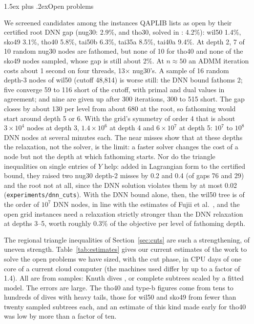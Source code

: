 \documentclass[10pt]{article}
\makeatletter
\renewcommand\subsection{\@startsection{subsection}{2}{\z@}{-3.25ex plus -1ex minus -.2ex}%
  {1.5ex plus .2ex}{\normalfont\normalsize\bfseries}}
\theoremstyle{remark}
\makeatother
\begin{document}
\subsection{Open problems}\label{sec:open}

We screened candidates among the instances QAPLIB lists as open by their certified
root DNN gap (nug30: 2.9\%, and tho30, solved in \cite{abgl}: 4.2\%): wil50 1.4\%,
sko49 3.1\%, tho40 5.8\%, tai50b 6.3\%, tai35a 8.5\%, tai40a 9.4\%. At depth 2, 7 of 10
random nug30 nodes are fathomed, but none of 10 for tho40 and none of the sko49 nodes
sampled, whose gap is still about 2\%. At $n\approx50$ an ADMM iteration costs about
1 second on four threads, 13$\times$ nug30's. A sample of 16 random depth-3 nodes of
wil50 (cutoff 48,814) is worse still: the DNN bound fathoms 2; five converge 59 to 116
short of the cutoff, with primal and dual values in agreement; and nine are given up
after 300 iterations, 300 to 515 short. The gap closes by about 130 per level from about
680 at the root, so fathoming would start around depth 5 or 6. With the grid's
symmetry of order 4 that is about $3\times10^4$ nodes at depth 3, $1.4\times10^6$ at
depth 4 and $6\times10^7$ at depth 5: $10^7$ to $10^8$ DNN nodes at several minutes
each. The near misses show that at these depths the relaxation, not the solver, is
the limit: a faster solver changes the cost of a node but not the depth at which
fathoming starts. Nor do the triangle inequalities on single entries of $Y$ help: added in Lagrangian
form to the certified bound, they raised two nug30 depth-2 misses by 0.2 and 0.4 (of
gaps 76 and 29) and the root not at all, since the DNN solution violates them by at
most 0.02 (\texttt{experiments/dnn\_cuts}). With the DNN bound alone, then, the
wil50 tree is of the order of $10^7$ DNN nodes, in line with the estimates of Fujii
et al.\ \cite{fujii}, and the open grid instances need a relaxation strictly
stronger than the DNN relaxation at depths 3--5, worth roughly 0.3\% of the
objective per level of fathoming depth.

The regional triangle inequalities of Section~\ref{sec:cuts} are such a
strengthening, of uneven strength. Table~\ref{tab:estimates} gives our current
estimates of the work to solve the open problems we have sized, with the cut phase,
in CPU days of one core of a current cloud computer (the machines used differ by
up to a factor of 1.4). All are from samples: Knuth dives \cite{knuth}, or complete
subtrees scaled by a fitted model. The errors are large. The tho40 and type-b
figures come from tens to hundreds of dives with heavy tails, those for wil50 and
sko49 from fewer than twenty sampled subtrees each, and an estimate of this kind
made early for tho40 was low by more than a factor of ten.
\end{document}
